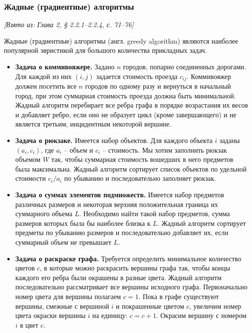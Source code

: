 \documentclass[a4paper,12pt]{article}
\begin{document}
\subsubsection*{Жадные (градиентные) алгоритмы}
\textit{[Взято из: Глава 2, § 2.2.1–2.2.4, с. 71–76]}

Жадные (градиентные) алгоритмы (англ. greedy algorithm) являются наиболее популярной эвристикой для большого количества прикладных задач. 

\begin{itemize}
    \item \textbf{Задача о коммивояжере.} Задано \(n\) городов, попарно соединенных дорогами. Для каждой из них \((i, j)\) задается стоимость проезда \(c_{ij}\). Коммивояжер должен посетить все \(n\) городов по одному разу и вернуться в начальный город, при этом суммарная стоимость проезда должна быть минимальной. Жадный алгоритм перебирает все ребра графа в порядке возрастания их весов и добавляет ребро, если оно не образует цикл (кроме завершающего) и не является третьим, инцидентным некоторой вершине.

    \item \textbf{Задача о рюкзаке.} Имеется набор объектов. Для каждого объекта \(i\) заданы \((a_i, c_i)\), где \(a_i\) – объем и \(c_i\) – стоимость. Мы хотим заполнить рюкзак объемом \(W\) так, чтобы суммарная стоимость вошедших в него предметов была максимальна. Жадный алгоритм сортирует список объектов по удельной стоимости \(c_i/a_i\) по убыванию и последовательно заполняет рюкзак.

    \item \textbf{Задача о суммах элементов подмножеств.} Имеется набор предметов различных размеров и некоторая верхняя положительная граница их суммарного объема \(L\). Необходимо найти такой набор предметов, сумма размеров которых была бы наиболее близка к \(L\). Жадный алгоритм сортирует предметы по убыванию размеров и последовательно добавляет их, если суммарный объем не превышает \(L\).

    \item \textbf{Задача о раскраске графа.} Требуется определить минимальное количество цветов \(c\), в которые можно раскрасить вершины графа так, чтобы концы каждого его ребра были окрашены в разные цвета. Жадный алгоритм последовательно рассматривает все вершины исходного графа. Первоначально номер цвета для вершины полагаем \(c = 1\). Пока в графе существуют вершины, смежные с вершиной \(i\) и покрашенные цветом \(c\), увеличим номер цвета окраски вершины \(i\) на единицу: \(c = c + 1\). Окрасим вершину с номером \(i\) в цвет \(c\).
\end{itemize}
\end{document}
